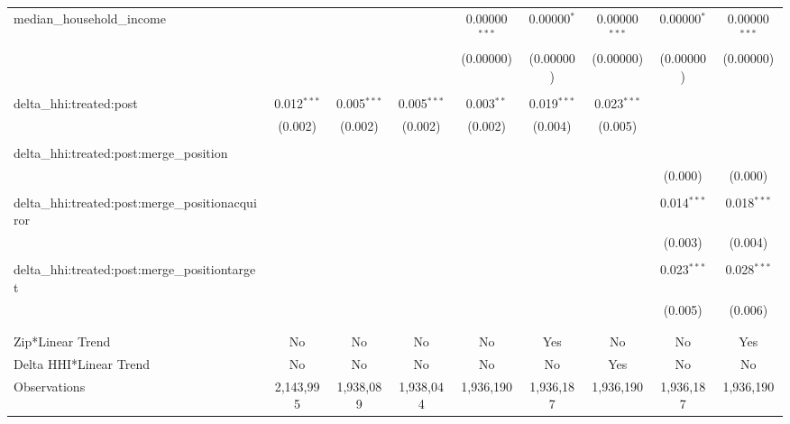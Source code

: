 \begin{table}[H]
{\begin{tabular}{@{\extracolsep{5pt}}lcccccccc}
  median\_household\_income &  &  &  & 0.00000$^{***}$ & 0.00000$^{*}$ & 0.00000$^{***}$ & 0.00000$^{*}$ & 0.00000$^{***}$ \\  

   &  &  &  & (0.00000) & (0.00000) & (0.00000) & (0.00000) & (0.00000) \\  

   & & & & & & & & \\  

  delta\_hhi:treated:post & 0.012$^{***}$ & 0.005$^{***}$ & 0.005$^{***}$ & 0.003$^{**}$ & 0.019$^{***}$ & 0.023$^{***}$ &  &  \\  

   & (0.002) & (0.002) & (0.002) & (0.002) & (0.004) & (0.005) &  &  \\  

   & & & & & & & & \\  

  delta\_hhi:treated:post:merge\_position &  &  &  &  &  &  &  &  \\  

   &  &  &  &  &  &  & (0.000) & (0.000) \\  

   & & & & & & & & \\  

  delta\_hhi:treated:post:merge\_positionacquiror &  &  &  &  &  &  & 0.014$^{***}$ & 0.018$^{***}$ \\  

   &  &  &  &  &  &  & (0.003) & (0.004) \\  

   & & & & & & & & \\  

  delta\_hhi:treated:post:merge\_positiontarget &  &  &  &  &  &  & 0.023$^{***}$ & 0.028$^{***}$ \\  

   &  &  &  &  &  &  & (0.005) & (0.006) \\  

   & & & & & & & & \\  

 \hline \\[-1.8ex]  

 Zip*Linear Trend & No & No & No & No & Yes & No & No & Yes \\  

 Delta HHI*Linear Trend & No & No & No & No & No & Yes & No & No \\  

 Observations & 2,143,995 & 1,938,089 & 1,938,044 & 1,936,190 & 1,936,187 & 1,936,190 & 1,936,187 & 1,936,190 \\  


\end{tabular}}
\end{table}
